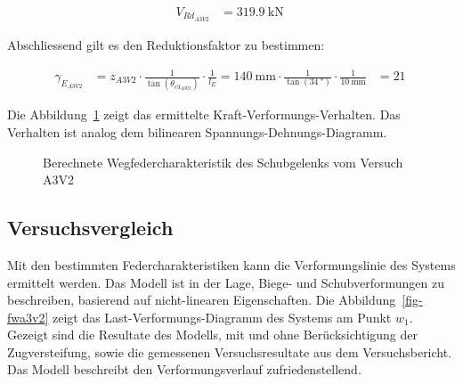 \documentclass[
  11pt,
  letterpaper,
]{scrreprt}
\begin{document}
$$
\begin{aligned}
V_{Rd_{A3V2}} &= 319.9\ \mathrm{kN} \;
\end{aligned}
$$

Abschliessend gilt es den Reduktionsfaktor zu bestimmen:

$$
\begin{aligned}
\gamma_{E_{A3V2}} &= z_{A3V2} \cdot \frac{ 1 }{ \tan \left( \theta_{c3_{A3V2}} \right) } \cdot \frac{1} { l_{E} }  = 140\ \mathrm{mm} \cdot \frac{ 1 }{ \tan \left( 34\ \mathrm{°} \right) } \cdot \frac{1} { 10\ \mathrm{mm} } &= 21\  
\end{aligned}
$$

Die Abbildung~\ref{fig-wegfeder-schub-a3v2} zeigt das ermittelte
Kraft-Verformungs-Verhalten. Das Verhalten ist analog dem bilinearen
Spannungs-Dehnungs-Diagramm.

\begin{figure}[H]


\caption{\label{fig-wegfeder-schub-a3v2}Berechnete
Wegfedercharakteristik des Schubgelenks vom Versuch A3V2}

\end{figure}%

\subsection{Versuchsvergleich}\label{versuchsvergleich}

Mit den bestimmten Federcharakteristiken kann die Verformungslinie des
Systems ermittelt werden. Das Modell ist in der Lage, Biege- und
Schubverformungen zu beschreiben, basierend auf nicht-linearen
Eigenschaften. Die Abbildung~\ref{fig-fwa3v2} zeigt das
Last-Verformungs-Diagramm des Systems am Punkt \(w_1\). Gezeigt sind die
Resultate des Modells, mit und ohne Berücksichtigung der Zugversteifung,
sowie die gemessenen Versuchsresultate aus dem Versuchsbericht. Das
Modell beschreibt den Verformungsverlauf zufriedenstellend.
\end{document}
